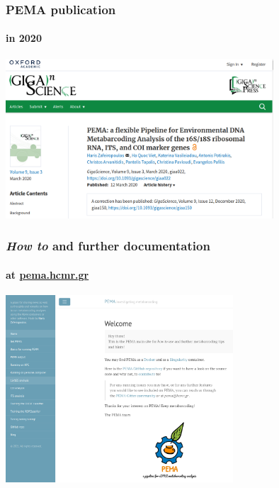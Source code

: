 \documentclass{beamer}
\begin{document}
   \begin{frame}
      \frametitle{PEMA publication}
      \framesubtitle{in 2020}
      \includegraphics[width=100mm]{resources/pema_publ.png}
   \end{frame}
   \fi 

   \begin{frame}
      \frametitle{\textit{How to} and further documentation}
      \framesubtitle{at \href{http://pema.hcmr.gr}{pema.hcmr.gr}}
      \includegraphics[width=85mm]{resources/pema_site.png}
   \end{frame}
   \fi 
\end{document}
